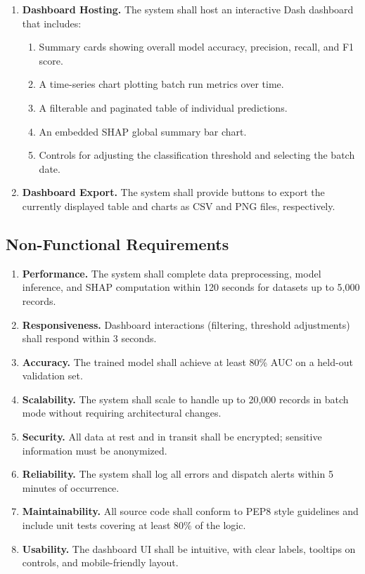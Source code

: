 \documentclass[15pt]{article}
\begin{document}
\begin{enumerate}[label=\textbf{FR\arabic*:}, leftmargin=3em]
  \item \textbf{Dashboard Hosting.} The system shall host an interactive Dash dashboard that includes:
    \begin{enumerate}[label=\alph*)]
      \item Summary cards showing overall model accuracy, precision, recall, and F1 score.
      \item A time-series chart plotting batch run metrics over time.
      \item A filterable and paginated table of individual predictions.
      \item An embedded SHAP global summary bar chart.
      \item Controls for adjusting the classification threshold and selecting the batch date.
    \end{enumerate}
  \item \textbf{Dashboard Export.} The system shall provide buttons to export the currently displayed table and charts as CSV and PNG files, respectively.
\end{enumerate}

\subsection{Non-Functional Requirements}

\begin{enumerate}[label=\textbf{NFR\arabic*:}, leftmargin=3em]
  \item \textbf{Performance.} The system shall complete data preprocessing, model inference, and SHAP computation within 120 seconds for datasets up to 5,000 records.
  \item \textbf{Responsiveness.} Dashboard interactions (filtering, threshold adjustments) shall respond within 3 seconds.
  \item \textbf{Accuracy.} The trained model shall achieve at least 80\% AUC on a held-out validation set.
  \item \textbf{Scalability.} The system shall scale to handle up to 20,000 records in batch mode without requiring architectural changes.
  \item \textbf{Security.} All data at rest and in transit shall be encrypted; sensitive information must be anonymized.
  \item \textbf{Reliability.} The system shall log all errors and dispatch alerts within 5 minutes of occurrence.
  \item \textbf{Maintainability.} All source code shall conform to PEP8 style guidelines and include unit tests covering at least 80\% of the logic.
  \item \textbf{Usability.} The dashboard UI shall be intuitive, with clear labels, tooltips on controls, and mobile-friendly layout.
\end{enumerate}
\end{document}
